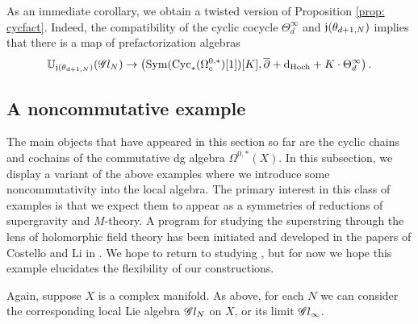 As an immediate corollary, we obtain a twisted version of Proposition \ref{prop: cycfact}.
Indeed, the compatibility of the cyclic cocycle $\Theta^\infty_d$ and $\mathfrak j(\theta_{d+1,N})$ implies that there is a map of prefactorization algebras
\[
\mathbb U_{\mathfrak j(\theta_{d+1,N})} (\mathscr G l_N) \to \left({\rm Sym}({\rm Cyc}_*(\Omega^{0,*}_c)[1])[K], \overline{\partial} + {\rm d}_{\rm Hoch} + K \cdot \Theta^\infty_d \right) .
\]


\subsection{A noncommutative example}


The main objects that have appeared in this section so far are the cyclic chains and cochains of the commutative dg algebra $\Omega^{0,*}(X)$. 
In this subsection, we display a variant of the above examples where we introduce some noncommutativity into the local algebra. 
The primary interest in this class of examples is that we expect them to appear as a symmetries of reductions of supergravity and $M$-theory. 
A program for studying the superstring through the lens of holomorphic field theory has been initiated and developed in the papers of Costello and Li in  \cite{...}.
We hope to return to studying , but for now we hope this example elucidates the flexibility of our constructions. 

Again, suppose $X$ is a complex manifold. 
As above, for each $N$ we can consider the corresponding local Lie algebra $\mathscr G l_N$ on $X$, or its limit $\mathscr G l_\infty$. 

